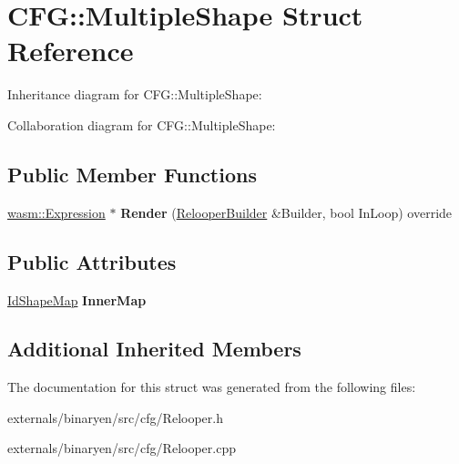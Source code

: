 \hypertarget{struct_c_f_g_1_1_multiple_shape}{}\section{C\+FG\+:\+:Multiple\+Shape Struct Reference}
\label{struct_c_f_g_1_1_multiple_shape}


Inheritance diagram for C\+FG\+:\+:Multiple\+Shape\+:


Collaboration diagram for C\+FG\+:\+:Multiple\+Shape\+:
\subsection*{Public Member Functions}
\begin{DoxyCompactItemize}
\item 
\mbox{\label{struct_c_f_g_1_1_multiple_shape_aafedf8ab2445b4e012cb2103eb5e3582}} 
\mbox{\hyperlink{classwasm_1_1_expression}{wasm\+::\+Expression}} $\ast$ {\bfseries Render} (\mbox{\hyperlink{class_c_f_g_1_1_relooper_builder}{Relooper\+Builder}} \&Builder, bool In\+Loop) override
\end{DoxyCompactItemize}
\subsection*{Public Attributes}
\begin{DoxyCompactItemize}
\item 
\mbox{\label{struct_c_f_g_1_1_multiple_shape_a7f6da60ccd35eedac939fad1a17cacfa}} 
\mbox{\hyperlink{classstd_1_1map}{Id\+Shape\+Map}} {\bfseries Inner\+Map}
\end{DoxyCompactItemize}
\subsection*{Additional Inherited Members}


The documentation for this struct was generated from the following files\+:\begin{DoxyCompactItemize}
\item 
externals/binaryen/src/cfg/Relooper.\+h\item 
externals/binaryen/src/cfg/Relooper.\+cpp\end{DoxyCompactItemize}
